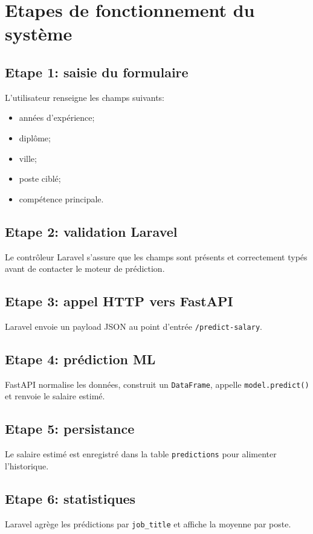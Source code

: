 \documentclass[11pt,a4paper]{article}
\begin{document}
\section{Etapes de fonctionnement du syst\`eme}

\subsection{Etape 1: saisie du formulaire}
L'utilisateur renseigne les champs suivants:
\begin{itemize}[leftmargin=1.2cm]
    \item ann\'ees d'exp\'erience;
    \item dipl\^ome;
    \item ville;
    \item poste cibl\'e;
    \item comp\'etence principale.
\end{itemize}

\subsection{Etape 2: validation Laravel}
Le contr\^oleur Laravel s'assure que les champs sont pr\'esents et correctement typ\'es avant de contacter le moteur de pr\'ediction.

\subsection{Etape 3: appel HTTP vers FastAPI}
Laravel envoie un payload JSON au point d'entr\'ee \texttt{/predict-salary}.

\subsection{Etape 4: pr\'ediction ML}
FastAPI normalise les donn\'ees, construit un \texttt{DataFrame}, appelle \texttt{model.predict()} et renvoie le salaire estim\'e.

\subsection{Etape 5: persistance}
Le salaire estim\'e est enregistr\'e dans la table \texttt{predictions} pour alimenter l'historique.

\subsection{Etape 6: statistiques}
Laravel agr\`ege les pr\'edictions par \texttt{job\_title} et affiche la moyenne par poste.
\end{document}
